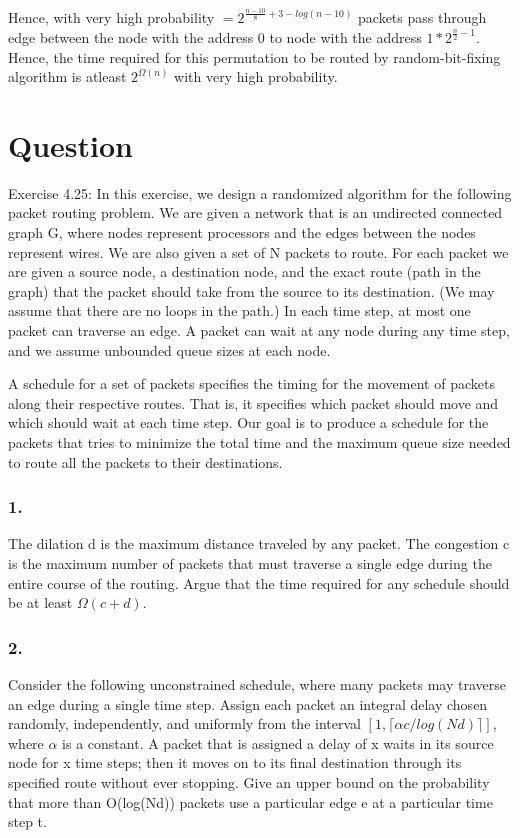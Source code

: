 \documentclass[10pt]{article}
\begin{document}
Hence, with very high probability $=2^{\frac{n-10}{8}+3-log(n-10)}$ packets pass through edge between the node with the address 0 to node with the address $1*2^{\frac{n}{2}-1}$. Hence, the time required for this permutation to be routed by random-bit-fixing algorithm is atleast $2^{\Omega(n)}$ with very high probability.

\section{Question}
Exercise 4.25: In this exercise, we design a randomized algorithm for the following packet routing problem. We are given a network that is an undirected connected graph G, where nodes represent processors and the edges between the nodes represent wires. We are also given a set of N packets to route. For each packet we are given a source node, a destination node, and the exact route (path in the graph) that the packet should take from the source to its destination. (We may assume that there are no loops in the path.) In each time step, at most one packet can traverse an edge. A packet can wait at any node during any time step, and we assume unbounded queue sizes at each node.

A schedule for a set of packets specifies the timing for the movement of packets along their respective routes. That is, it specifies which packet should move and which should wait at each time step. Our goal is to produce a schedule for the packets that tries to minimize the total time and the maximum queue size needed to route all the packets to their destinations.

\subsubsection{1.}
The dilation d is the maximum distance traveled by any packet. The congestion c is the maximum number of packets that must traverse a single edge during the entire course of the routing. Argue that the time required for any schedule should be at least $\Omega(c+d)$.

\subsubsection{2.}
Consider the following unconstrained schedule, where many packets may traverse an edge during a single time step. Assign each packet an integral delay chosen randomly, independently, and uniformly from the interval $[1, \lceil \alpha c/log(Nd)\rceil]$, where $\alpha$ is a constant. A packet that is assigned a delay of x waits in its source node for x time steps; then it moves on to its final destination through its specified route without ever stopping. Give an upper bound on the probability that more than O(log(Nd)) packets use a particular edge e at a particular time step t.
\end{document}
